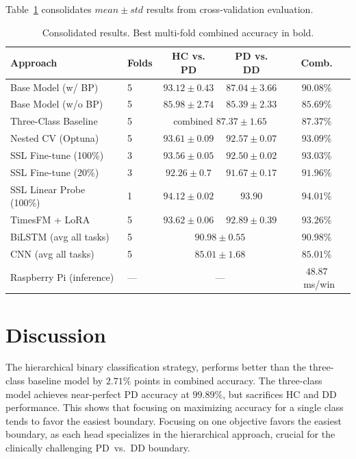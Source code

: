 \documentclass[pmlr]{jmlr}
\begin{document}
Table~\ref{tab:summary} consolidates $mean{\pm}std$  results from cross-validation evaluation.
\begin{table}[H]
\caption{Consolidated results. Best multi-fold combined accuracy in
         bold.}
\label{tab:summary}
\begin{center}
\begin{tabular}{llccc}
\toprule
\textbf{Approach} & \textbf{Folds} &
  \textbf{HC vs. PD}& \textbf{PD vs. DD}& \textbf{Comb.} \\
\midrule
Base Model (w/ BP) & 5 &
  $93.12{\pm}0.43$ & $87.04{\pm}3.66$ & $90.08\%$ \\
Base Model (w/o BP) & 5 &
  $85.98{\pm}2.74$ & $85.39{\pm}2.33$ & $85.69\%$ \\
Three-Class Baseline & 5 &
  \multicolumn{2}{c}{combined $87.37{\pm}1.65$} & $87.37\%$ \\
\midrule
Nested CV (Optuna) & 5 &
  $93.61{\pm}0.09$ & $92.57{\pm}0.07$ & $93.09\%$ \\
SSL Fine-tune (100\%) & 3 &
  $93.56 {\pm}0.05$& $92.50 {\pm}0.02$& $93.03\%$ \\
SSL Fine-tune (20\%) & 3 &
  $92.26 {\pm}0.7$& $91.67 {\pm}0.17$& $91.96\%$ \\
SSL Linear Probe (100\%) & 1 &
  $94.12 {\pm}0.02$& $93.90$ & $94.01\%$ \\
TimesFM + LoRA & 5&
  $93.62{\pm}0.06$ & $92.89{\pm}0.39$ & $\mathbf{93.26\%}$ \\
\midrule
BiLSTM (avg all tasks) & 5 &
  \multicolumn{2}{c}{$90.98 {\pm}0.55$} & $90.98\%$ \\
CNN (avg all tasks) & 5 &
  \multicolumn{2}{c}{$85.01 {\pm}1.68$} & $85.01\%$ \\
\midrule
Raspberry Pi (inference) & --- &
  \multicolumn{2}{c}{---} & $48.87$~ms/win \\
\bottomrule
\end{tabular}
\end{center}
\end{table}
\section{Discussion}
\label{sec:discussion}

The hierarchical binary classification strategy, performs better than the three-class baseline model by $2.71\%$ points in combined accuracy. The three-class model achieves near-perfect PD accuracy at $99.89\%$, but sacrifices HC and DD performance. This shows that focusing on maximizing accuracy for a single class tends to favor the easiest boundary. Focusing on one objective favors the easiest boundary, as each head specializes in the hierarchical approach, crucial for the clinically challenging PD~vs.~DD boundary. 
\end{document}
